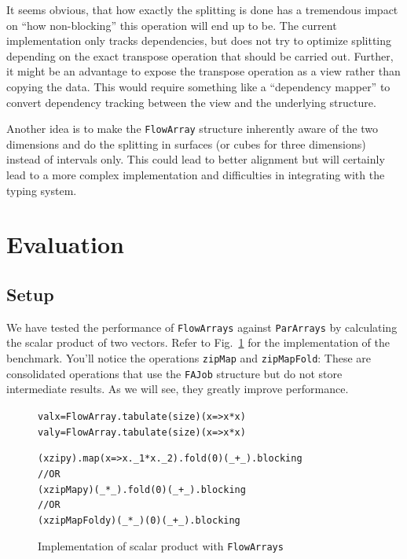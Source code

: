 \documentclass[runningheads,a4paper,fleqn]{llncs}
\begin{document}
It seems obvious, that how exactly the splitting is done has a
tremendous 
impact on ``how non-blocking'' this operation will end up to be. The
current implementation only tracks dependencies, but does not try to
optimize splitting depending on the exact transpose operation that
should be carried out. Further, it might be an advantage to expose the
transpose operation as a view rather than copying the data. This would
require something like a ``dependency mapper'' to convert dependency
tracking between the view and the underlying structure.

Another idea is to make the \texttt{FlowArray} structure inherently aware of
the two dimensions and do the splitting in surfaces (or cubes for
three dimensions) instead of intervals only. This could lead to better
alignment but will certainly lead to a more complex implementation and
difficulties in integrating with the typing system.

\section{Evaluation}
\label{sec:evaluation}

\subsection{Setup}

We have tested the performance of \texttt{FlowArrays} against
\texttt{ParArrays} by calculating the scalar product of two vectors. Refer to
Fig.~\ref{fig:scalar-product} for the implementation of the
benchmark. You'll notice the operations \texttt{zipMap} and
\texttt{zipMapFold}: These are consolidated operations that use the
\texttt{FAJob} structure but do not store intermediate results. As we
will see, they greatly improve performance.

\begin{figure}
\begin{minipage}[t]{6cm}
\begin{alltt}
{\scriptsize
val x = FlowArray.tabulate(size)(x => x*x)
val y = FlowArray.tabulate(size)(x => x*x)

(x zip y).map(x => x._1 * x._2).fold(0)(_ + _).blocking
// OR
(x zipMap y)(_ * _).fold(0)(_ + _).blocking
// OR
(x zipMapFold y)(_ * _)(0)(_ + _).blocking
}
\end{alltt}
\end{minipage}
\caption{Implementation of scalar product with \texttt{FlowArrays}}
\label{fig:scalar-product}
\end{figure}
\end{document}
